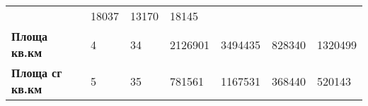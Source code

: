 \documentclass[
]{article}
\begin{document}
\begin{longtable}[]{@{}lllllll@{}}
\begin{minipage}[t]{0.12\columnwidth}
\end{minipage} & \begin{minipage}[t]{0.12\columnwidth}\raggedright
18037\strut
\end{minipage} & \begin{minipage}[t]{0.12\columnwidth}\raggedright
13170\strut
\end{minipage} & \begin{minipage}[t]{0.13\columnwidth}\raggedright
18145\strut
\end{minipage}\tabularnewline
\begin{minipage}[t]{0.18\columnwidth}\raggedright
\textbf{Площа кв.км}\strut
\end{minipage} & \begin{minipage}[t]{0.08\columnwidth}\raggedright
4\strut
\end{minipage} & \begin{minipage}[t]{0.06\columnwidth}\raggedright
34\strut
\end{minipage} & \begin{minipage}[t]{0.12\columnwidth}\raggedright
2126901\strut
\end{minipage} & \begin{minipage}[t]{0.12\columnwidth}\raggedright
3494435\strut
\end{minipage} & \begin{minipage}[t]{0.12\columnwidth}\raggedright
828340\strut
\end{minipage} & \begin{minipage}[t]{0.13\columnwidth}\raggedright
1320499\strut
\end{minipage}\tabularnewline
\begin{minipage}[t]{0.18\columnwidth}\raggedright
\textbf{Площа сг кв.км}\strut
\end{minipage} & \begin{minipage}[t]{0.08\columnwidth}\raggedright
5\strut
\end{minipage} & \begin{minipage}[t]{0.06\columnwidth}\raggedright
35\strut
\end{minipage} & \begin{minipage}[t]{0.12\columnwidth}\raggedright
781561\strut
\end{minipage} & \begin{minipage}[t]{0.12\columnwidth}\raggedright
1167531\strut
\end{minipage} & \begin{minipage}[t]{0.12\columnwidth}\raggedright
368440\strut
\end{minipage} & \begin{minipage}[t]{0.13\columnwidth}\raggedright
520143\strut
\end{minipage}\tabularnewline
\bottomrule
\end{longtable}
\end{document}
